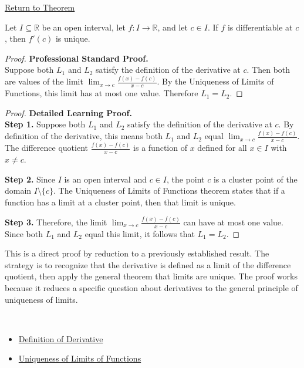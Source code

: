 \newpage
{}
\label{prf:uniqueness-of-derivative}

\begin{remark*}[Return]
\hyperref[thm:uniqueness-of-the-derivative]{Return to Theorem}
\end{remark*}

\begin{theorem*}
Let $I \subseteq \mathbb{R}$ be an open interval, let $f : I \to \mathbb{R}$, and let $c \in I$. If $f$ is differentiable at $c$, then $f'(c)$ is unique.
\end{theorem*}

\begin{proof}
\textbf{Professional Standard Proof.}~\\
Suppose both $L_1$ and $L_2$ satisfy the definition of the derivative at $c$. Then both are values of the limit $\lim_{x \to c} \frac{f(x)-f(c)}{x-c}$. By the Uniqueness of Limits of Functions, this limit has at most one value. Therefore $L_1 = L_2$.
\end{proof}

\begin{proof}
\textbf{Detailed Learning Proof.}~\\

\textbf{Step 1.} Suppose both $L_1$ and $L_2$ satisfy the definition of the derivative at $c$. By definition of the derivative, this means both $L_1$ and $L_2$ equal $\lim_{x \to c} \frac{f(x)-f(c)}{x-c}$. The difference quotient $\frac{f(x)-f(c)}{x-c}$ is a function of $x$ defined for all $x \in I$ with $x \neq c$.

\textbf{Step 2.} Since $I$ is an open interval and $c \in I$, the point $c$ is a cluster point of the domain $I \setminus \{c\}$. The Uniqueness of Limits of Functions theorem states that if a function has a limit at a cluster point, then that limit is unique.

\textbf{Step 3.} Therefore, the limit $\lim_{x \to c} \frac{f(x)-f(c)}{x-c}$ can have at most one value. Since both $L_1$ and $L_2$ equal this limit, it follows that $L_1 = L_2$.
\end{proof}

\begin{remark*}
This is a direct proof by reduction to a previously established result. The strategy is to recognize that the derivative is defined as a limit of the difference quotient, then apply the general theorem that limits are unique. The proof works because it reduces a specific question about derivatives to the general principle of uniqueness of limits.
\end{remark*}

\begin{remark*}[Dependencies]~\\
\begin{itemize}
  \item \hyperref[def:derivative]{Definition of Derivative}
  \item \hyperref[thm:limit-unique]{Uniqueness of Limits of Functions}
\end{itemize}
\end{remark*}
